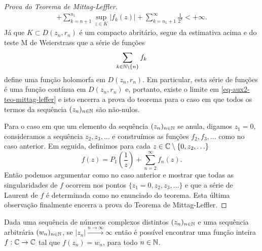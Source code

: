 \begin{proof}[Prova do Teorema de Mittag-Leffler]
\begin{align*}
    +
    \sum_{k=n+1}^{n_1}\sup_{z\in K}|f_k(z)|
    +    
    \sum_{k=n_1+1}^{\infty}\frac{1}{2^k}
    <+\infty.
    \end{align*}
    Já que $K\subset D(z_n,r_n)$ é um compacto abritário, segue da 
    estimativa acima e do teste M de Weierstrass
    que a série de funções
    \[
    \sum_{k\in \mathbb{N}\setminus\{n\}} f_k
    \]
    define uma função holomorfa em $D(z_n,r_n)$.
    Em particular, esta série de funções é uma função contínua 
    em $D(z_n,r_n)$ e, portanto, existe o 
    limite em \eqref{eq-aux2-teo-mittag-leffer}
    e isto encerra a prova do teorema para o caso em que
    todos os termos da sequência $(z_n)_{n\in\mathbb{N}}$
    são não-nulos. 
    
    
    \medskip 
    
    Para o caso em que um elemento da sequência $(z_n)_{n\in\mathbb{N}}$ 
    se anula, digamos $z_1=0$,
    consideramos a sequência $z_2,z_3,\ldots$ e 
    construímos as funções $f_2,f_3,\ldots$ como
    no caso anterior. Em seguida, definimos para 
    cada $z\in\mathbb{C}\setminus \{0,z_2,\ldots\}$
    \[
    f(z) = P_1\left(\frac{1}{z}\right) +\sum_{n=2}^{\infty}f_n(z).
    \]
    Então podemos argumentar como no caso anterior 
    e mostrar que todas as singularidades de $f$ ocorrem
    nos pontos $\{z_1=0,z_2,z_3,\ldots\}$ e que a série de Laurent de $f$ é determinada como no enunciado do teorema. 
    Esta última observação finalmente encerra a prova do Teorema de Mittag-Leffler.
    \end{proof}
    
    
    
    
    
    \begin{teorema}
    \label{teo-interpolacao}
    Dada uma sequência de números complexos distintos
    $(z_n)_{n\in\mathbb{N}}$ e uma sequência arbitrária $(w_n)_{n\in\mathbb{N}}$, 
    se $|z_n|\xrightarrow{n\to\infty}\infty$
    então é possível 
    encontrar uma função inteira $f:\mathbb{C}\to\mathbb{C}$ tal 
    que $f(z_n)=w_n$, para todo $n\in\mathbb{N}$.
    \end{teorema}
    
